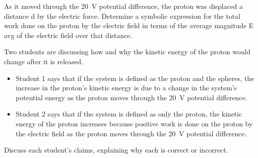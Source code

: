 \documentclass{../../../oss-ap12ibhl}
\begin{document}
\begin{questions}
\begin{parts}
\begin{subparts}
      \subpart As it moved through the \SI{20}{\volt} potential difference, the
      proton was displaced a distance d by the electric force. Determine a
      symbolic expression for the total work done on the proton by the electric
      field in terms of the average magnitude E avg of the electric field over
      that distance.

      \subpart Two students are discussing how and why the kinetic energy of
      the proton would change after it is released.
      \begin{itemize}
      \item Student 1 says that if the system is defined as the proton and the
        spheres, the increase in the proton’s kinetic energy is due to a change
        in the system's potential energy as the proton moves through the
        \SI{20}{\volt} potential difference.
      \item Student 2 says that if the system is defined as only the proton,
        the kinetic energy of the proton increases because positive work is
        done on the proton by the electric field as the proton moves through
        the \SI{20}{\volt} potential difference.
      \end{itemize}
      Discuss each student's claims, explaining why each is correct or
      incorrect.
    \end{subparts}
  \end{parts}
\end{questions}
\end{document}
